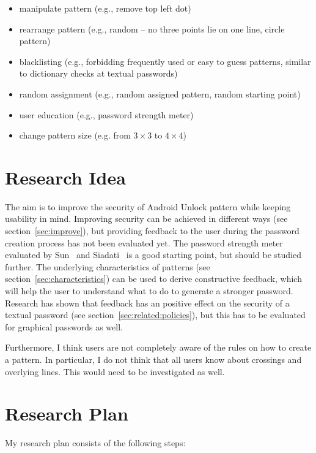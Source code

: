 \documentclass[twocolumn, a4paper, 10pt]{article}
\begin{document}
\begin{itemize}
	\setlength\itemsep{0em}
	\item manipulate pattern (e.g., remove top left dot)
	\item rearrange pattern (e.g., random -- no three points lie on one line, circle pattern)
	\item blacklisting (e.g., forbidding frequently used or easy to guess patterns, similar to dictionary checks at textual passwords)
	\item random assignment (e.g., random assigned pattern, random starting point)
	\item user education (e.g., password strength meter)
	\item change pattern size (e.g. from $3\times3$ to $4\times4$)
\end{itemize}

\section{Research Idea}
\label{sec:idea}
The aim is to improve the security of Android Unlock pattern while keeping usability in mind. Improving security can be achieved in different ways (see section~\ref{sec:improve}), but providing feedback to the user during the password creation process has not been evaluated yet. The password strength meter evaluated by Sun~\cite{Sun2014308} and Siadati~\cite{siadati2015fortifying} is a good starting point, but should be studied further. The underlying characteristics of patterns (see section~\ref{sec:characteristics}) can be used to derive constructive feedback, which will help the user to understand what to do to generate a stronger password. Research has shown that feedback has an positive effect on the security of a textual password (see section~\ref{sec:related:policies}), but this has to be evaluated for graphical passwords as well.

Furthermore, I think users are not completely aware of the rules on how to create a pattern. In particular, I do not think that all users know about crossings and overlying lines. This would need to be investigated as well.


\section{Research Plan}
\label{sec:plan}

My research plan consists of the following steps:
\end{document}
